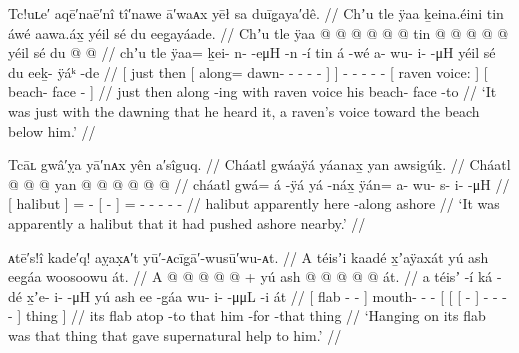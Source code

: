 \ex\label{ex:90-34-dawn-hear-raven-beach}%
%
\begingl
	\glpreamble	Tc!uʟe′ aqē′naē′nî tî′nawe ā′waᴀx yēł sa duīg̣aya′dê. //
	\glpreamble	Chʼu tle ÿaa ḵeina.éini tin áwé aawa.áx̱ yéil sé du eeg̱ayáade. //
	\gla	{} Chʼu tle
			{} ÿaa @  @ {} @ {} @ {} @ {} @ {} {}
			tin {}
		 @ {}
		 @ {} @ {} @ {} @ {}
		{} yéil sé {}
		{} du  @ {} @ {} {} //
	\glb	{} chʼu tle
			{} ÿaa= ḵei- n-  -eμH -n -í {}
			tin {}
		á -wé
		a- wu- i-  -μH
		{} yéil sé {}
		{} du eeḵ- ÿáᵏ -de {} //
	\glc	{}[ just then
			{}[ along= dawn- -  - - - {}]
			 {}]
		 -
		- - -  -
		{}[ raven voice: {}]
		{}[  beach- face - {}] //
	\gld	{} just then
			{} along  {} {} {} {} -ing {}
			with {}
		 {}
		 {} {} {} {}
		{} raven voice {}
		{} his beach- face -to {} //
	\glft	‘It was just with the dawning that he heard it, a raven’s voice toward the beach below him.’
		//
\endgl
\xe

\ex\label{ex:90-35-halibut-pushed-ashore}%
%
\begingl
	\glpreamble	Tcāʟ gwâ′ỵa yā′nᴀx yên a′sîguq. //
	\glpreamble	Cháatl gwáaÿá yáanax̱ yan awsigúḵ. //
	\gla	{} Cháatl {}
		 @ {} @ {}
		{}  @ {} {}
		yan @  @ {} @ {} @ {} @ {} @ {} //
	\glb	{} cháatl {}
		gwá= á -ÿá
		{} yá -náx̱ {}
		ÿán= a- wu- s- i-  -μH //
	\glc	{}[ halibut {}]
		=  -
		{}[  - {}]
		= - - - -  - //
	\gld	{} halibut {}
		apparently\•  {}
		{} here -along {}
		ashore  {} {} {} {} {}  //
	\glft	‘It was apparently a halibut that it had pushed ashore nearby.’
		//
\endgl
\xe

\ex\label{ex:90-36-hang-on-flab-helper}%
%
\begingl
	\glpreamble	ᴀtē′s!î kade′q! aỵax̣ᴀ′t yū′-ᴀcīg̣ā′-wusū′wu-ᴀt. //
	\glpreamble	A téisʼi kaadé x̱ʼaÿaxát yú ash eeg̱áa woosoowu át. //
	\gla	{} A  @ {}  @ {} {}
		 @ {} @ {} @ {} +
		{} yú {} {} ash  @ {} {}
			 @ {} @ {} @ {} @ {} {} át. {} //
	\glb	{} a téisʼ -í ká -dé {}
		x̱ʼe- i-  -μH
		{} yú {} {} ash ee -g̱áa {}
			wu- i-  -μμL -i {} át {} //
	\glc	{}[  flab -  - {}]
		mouth- -  -
		{}[  {}[ {}[   - {}]
			- -  - - {}] thing {}] //
	\gld	{} its flab {} atop -to {}
		 {} {} {}
		{} that {} {} him {} -for {}
			 {} {} {} -that {} thing {} //
	\glft	‘Hanging on its flab was that thing that gave supernatural help to him.’
		//
\endgl
\xe

